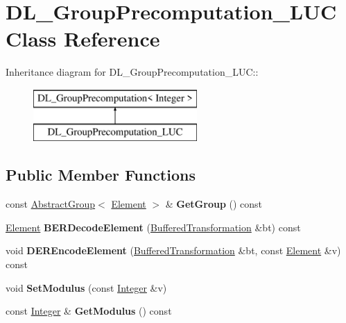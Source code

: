 \hypertarget{class_d_l___group_precomputation___l_u_c}{
\section{DL\_\-GroupPrecomputation\_\-LUC Class Reference}
\label{class_d_l___group_precomputation___l_u_c}
}
Inheritance diagram for DL\_\-GroupPrecomputation\_\-LUC::\begin{figure}[H]
\begin{center}
\leavevmode
\includegraphics[height=2cm]{class_d_l___group_precomputation___l_u_c}
\end{center}
\end{figure}
\subsection*{Public Member Functions}
\begin{DoxyCompactItemize}
\item 
\hypertarget{class_d_l___group_precomputation___l_u_c_a53cac2c8cec8c2a54e4698e672e57f04}{
const \hyperlink{class_abstract_group}{AbstractGroup}$<$ \hyperlink{class_integer}{Element} $>$ \& {\bfseries GetGroup} () const }
\label{class_d_l___group_precomputation___l_u_c_a53cac2c8cec8c2a54e4698e672e57f04}

\item 
\hypertarget{class_d_l___group_precomputation___l_u_c_a35d98978f65ba1d73a5f10383257cbcb}{
\hyperlink{class_integer}{Element} {\bfseries BERDecodeElement} (\hyperlink{class_buffered_transformation}{BufferedTransformation} \&bt) const }
\label{class_d_l___group_precomputation___l_u_c_a35d98978f65ba1d73a5f10383257cbcb}

\item 
\hypertarget{class_d_l___group_precomputation___l_u_c_a25fba9d654cad538bde564b058eb100b}{
void {\bfseries DEREncodeElement} (\hyperlink{class_buffered_transformation}{BufferedTransformation} \&bt, const \hyperlink{class_integer}{Element} \&v) const }
\label{class_d_l___group_precomputation___l_u_c_a25fba9d654cad538bde564b058eb100b}

\item 
\hypertarget{class_d_l___group_precomputation___l_u_c_aee69e214c0c390a463034c7c076291a7}{
void {\bfseries SetModulus} (const \hyperlink{class_integer}{Integer} \&v)}
\label{class_d_l___group_precomputation___l_u_c_aee69e214c0c390a463034c7c076291a7}

\item 
\hypertarget{class_d_l___group_precomputation___l_u_c_a0d91bbf17d557d905ca21b747e3d670c}{
const \hyperlink{class_integer}{Integer} \& {\bfseries GetModulus} () const }
\label{class_d_l___group_precomputation___l_u_c_a0d91bbf17d557d905ca21b747e3d670c}

\end{DoxyCompactItemize}


